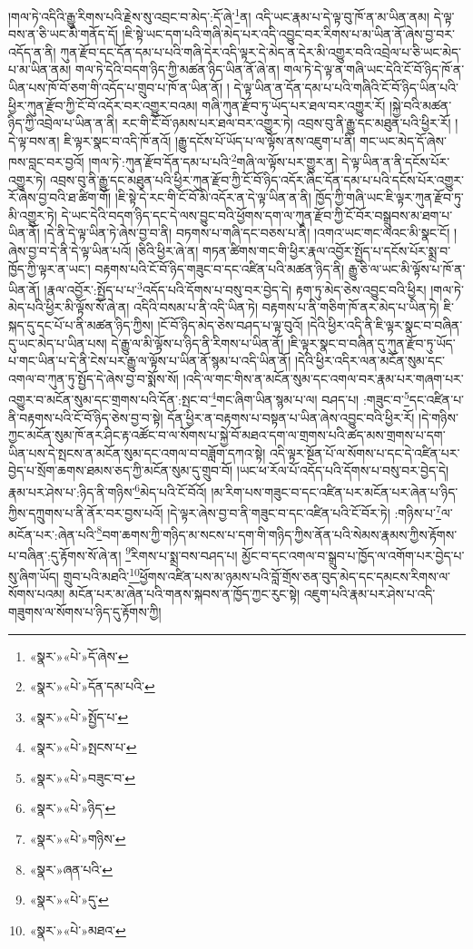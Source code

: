 །གལ་ཏེ་འདིའི་རྒྱུ་རིགས་པའི་རྗེས་སུ་འབྲང་བ་མེད་:དོ་ཞེ་\footnote{«སྣར་»«པེ་»དོ་ཞེས་}ན། འདི་ཡང་རྣམ་པ་དེ་ལྟ་བུ་ཁོ་ན་མ་ཡིན་ནམ། དེ་ལྟ་བས་ན་ཅི་ཡང་མི་གནོད་དོ། །ཇི་སྟེ་ཡང་དག་པའི་གཞི་མེད་པར་འདི་འབྱུང་བར་རིགས་པ་མ་ཡིན་ནོ་ཞེས་བྱ་བར་འདོད་ན་ནི། ཀུན་རྫོབ་དང་དོན་དམ་པ་པའི་གཞི་དེར་འདི་ལྟར་དེ་མེད་ན་དེར་མི་འགྱུར་བའི་འབྲེལ་པ་ཅི་ཡང་མེད་པ་མ་ཡིན་ནམ། གལ་ཏེ་དེའི་བདག་ཉིད་ཀྱི་མཚན་ཉིད་ཡིན་ནོ་ཞེ་ན། གལ་ཏེ་དེ་ལྟ་ན་གཞི་ཡང་དེའི་ངོ་བོ་ཉིད་ཁོ་ན་ཡིན་པས་ཁོ་བོ་ཅག་གི་འདོད་པ་གྲུབ་པ་ཁོ་ན་ཡིན་ནོ། །
དེ་ལྟ་ཡིན་ན་དོན་དམ་པ་པའི་གཞིའི་ངོ་བོ་ཉིད་ཡིན་པའི་ཕྱིར་ཀུན་རྫོབ་ཀྱི་ངོ་བོ་འདོར་བར་འགྱུར་བའམ། གཞི་ཀུན་རྫོབ་ཏུ་ཡོད་པར་ཐལ་བར་འགྱུར་རོ། །སྐྱེ་བའི་མཚན་ཉིད་ཀྱི་འབྲེལ་པ་ཡིན་ན་ནི། རང་གི་ངོ་བོ་ཉམས་པར་ཐལ་བར་འགྱུར་ཏེ། འབྲས་བུ་ནི་རྒྱུ་དང་མཐུན་པའི་ཕྱིར་རོ། །དེ་ལྟ་བས་ན། ཇི་ལྟར་སྣང་བ་འདི་ཁོ་ནའོ། །རྒྱུ་དངོས་པོ་ཡོད་པ་ལ་ལྟོས་ནས་འཇུག་པ་ནི། གང་ཡང་མེད་དོ་ཞེས་ཁས་བླང་བར་བྱའོ། །གལ་ཏེ་:ཀུན་རྫོབ་དོན་དམ་པ་པའི་\footnote{«སྣར་»«པེ་»དོན་དམ་པའི་}གཞི་ལ་ལྟོས་པར་གྱུར་ན། དེ་ལྟ་ཡིན་ན་ནི་དངོས་པོར་འགྱུར་ཏེ། འབྲས་བུ་ནི་རྒྱུ་དང་མཐུན་པའི་ཕྱིར་ཀུན་རྫོབ་ཀྱི་ངོ་བོ་ཉིད་འདོར་ཞིང་དོན་དམ་པ་པའི་དངོས་པོར་འགྱུར་རོ་ཞེས་བྱ་བའི་ཐ་ཚིག་གོ། །ཇི་སྟེ་དེ་རང་གི་ངོ་བོ་མི་འདོར་ན་དེ་ལྟ་ཡིན་ན་ནི། ཁྱོད་ཀྱི་གཞི་ཡང་ཇི་ལྟར་ཀུན་རྫོབ་ཏུ་མི་འགྱུར་ཏེ། དེ་ཡང་དེའི་བདག་ཉིད་དང་དེ་ལས་བྱུང་བའི་ཕྱོགས་དག་ལ་ཀུན་རྫོབ་ཀྱི་ངོ་བོར་བསྒྲུབས་མ་ཐག་པ་ཡིན་ནོ། །དེ་ནི་དེ་ལྟ་ཡིན་ཏེ་ཞེས་བྱ་བ་ནི། བཏགས་པ་གཞི་དང་བཅས་པ་ནི། །འགའ་ཡང་གང་ལའང་མི་སྣང་ངོ། །ཞེས་བྱ་བ་དེ་ནི་དེ་ལྟ་ཡིན་པའོ། །ཅིའི་ཕྱིར་ཞེ་ན། གཏན་ཚིགས་གང་གི་ཕྱིར་རྣལ་འབྱོར་སྤྱོད་པ་དངོས་པོར་སྨྲ་བ་ཁྱོད་ཀྱི་ལྟར་ན་ཡང་། བརྟགས་པའི་ངོ་བོ་ཉིད་གཟུང་བ་དང་འཛིན་པའི་མཚན་ཉིད་ནི། རྒྱུ་ཅི་ལ་ཡང་མི་ལྟོས་པ་ཁོ་ན་ཡིན་ནོ། །རྣལ་འབྱོར་:སྤྱོད་པ་པ་\footnote{«སྣར་»«པེ་»སྤྱོད་པ་}འདོད་པའི་དོགས་པ་བསུ་བར་བྱེད་དེ། རྟག་ཏུ་མེད་ཅེས་འབྱུང་བའི་ཕྱིར། །གལ་ཏེ་མེད་པའི་ཕྱིར་མི་ལྟོས་སོ་ཞེ་ན། འདིའི་བསམ་པ་ནི་འདི་ཡིན་ཏེ། བརྟགས་པ་ནི་གཅིག་ཁོ་ནར་མེད་པ་ཡིན་ཏེ། ཇི་སྐད་དུ་དང་པོ་པ་ནི་མཚན་ཉིད་ཀྱིས། །ངོ་བོ་ཉིད་མེད་ཅེས་བཤད་པ་ལྟ་བུའོ། །དེའི་ཕྱིར་འདི་ནི་ཇི་ལྟར་སྣང་བ་བཞིན་དུ་ཡང་མེད་པ་ཡིན་པས། དེ་རྒྱུ་ལ་མི་ལྟོས་པ་ཉིད་ནི་རིགས་པ་ཡིན་ནོ། །ཇི་ལྟར་སྣང་བ་བཞིན་དུ་ཀུན་རྫོབ་ཏུ་ཡོད་པ་གང་ཡིན་པ་དེ་ནི་ངེས་པར་རྒྱུ་ལ་ལྟོས་པ་ཡིན་ནོ་སྙམ་པ་འདི་ཡིན་ནོ། །དེའི་ཕྱིར་འདིར་ལན་མངོན་སུམ་དང་འགལ་བ་ཀུན་ཏུ་སྤྱོད་དེ་ཞེས་བྱ་བ་སྨོས་སོ། །འདི་ལ་གང་གིས་ན་མངོན་སུམ་དང་འགལ་བར་རྣམ་པར་གཞག་པར་འགྱུར་བ་མངོན་སུམ་དང་གྲགས་པའི་དོན་:སྤང་བ་\footnote{«སྣར་»«པེ་»སྤངས་པ་}གང་ཞིག་ཡིན་སྙམ་པ་ལ། བཤད་པ། :གཟུང་བ་\footnote{«སྣར་»«པེ་»བཟུང་བ་}དང་འཛིན་པ་ནི་བརྟགས་པའི་ངོ་བོ་ཉིད་ཅེས་བྱ་བ་སྟེ། དོན་ཕྱིར་ན་བརྟགས་པ་བསྟན་པ་ཡིན་ཞེས་འབྱུང་བའི་ཕྱིར་རོ། །དེ་གཉིས་ཀྱང་མངོན་སུམ་ཁོ་ནར་ཤིང་རྟ་འཚོང་བ་ལ་སོགས་པ་སྐྱེ་བོ་མཐའ་དག་ལ་གྲགས་པའི་ཚད་མས་གྲགས་པ་དག་ཡིན་པས་དེ་སྤངས་ན་མངོན་སུམ་དང་འགལ་བ་བཟློག་དཀའ་སྟེ། འདི་ལྟར་སྔོན་པོ་ལ་སོགས་པ་དང་དེ་འཛིན་པར་བྱེད་པ་སྲོག་ཆགས་ཐམས་ཅད་ཀྱི་མངོན་སུམ་དུ་གྲུབ་བོ། །ཡང་ཕ་རོལ་པོ་འདོད་པའི་དོགས་པ་བསུ་བར་བྱེད་དེ། རྣམ་པར་ཤེས་པ་:ཉིད་ནི་གཉིས་\footnote{«སྣར་»«པེ་»ཉིད་}མེད་པའི་ངོ་བོའོ། །མ་རིག་པས་གཟུང་བ་དང་འཛིན་པར་མངོན་པར་ཞེན་པ་ཉིད་ཀྱིས་དཀྲུགས་པ་ནི་ནོར་བར་བྱས་པའོ། །དེ་ལྟར་ཞེས་བྱ་བ་ནི་གཟུང་བ་དང་འཛིན་པའི་ངོ་བོར་ཏེ། :གཉིས་པ་\footnote{«སྣར་»«པེ་»གཉིས་}ལ་མངོན་པར་:ཞེན་པའི་\footnote{«སྣར་»ཞན་པའི་}བག་ཆགས་ཀྱི་གཉིད་མ་སངས་པ་དག་གི་གཉིད་ཀྱིས་ནོན་པའི་སེམས་རྣམས་ཀྱིས་རྟོགས་པ་བཞིན་:དུ་རྟོགས་སོ་ཞེ་ན། \footnote{«སྣར་»«པེ་»དུ་}རིགས་པ་སྨྲ་བས་བཤད་པ། མྱོང་བ་དང་འགལ་བ་སྒྲུབ་པ་ཁྱོད་ལ་འགོག་པར་བྱེད་པ་སུ་ཞིག་ཡོད། གྲུབ་པའི་མཐའི་\footnote{«སྣར་»«པེ་»མཐའ་}ཕྱོགས་འཛིན་པས་མ་ཉམས་པའི་བློ་གྲོས་ཅན་བུད་མེད་དང་དམངས་རིགས་ལ་སོགས་པའམ། མངོན་པར་མ་ཞེན་པའི་གནས་སྐབས་ན་ཁྱོད་ཀྱང་རུང་སྟེ། འཇུག་པའི་རྣམ་པར་ཤེས་པ་འདི་གཟུགས་ལ་སོགས་པ་ཉིད་དུ་རྟོགས་ཀྱི། 